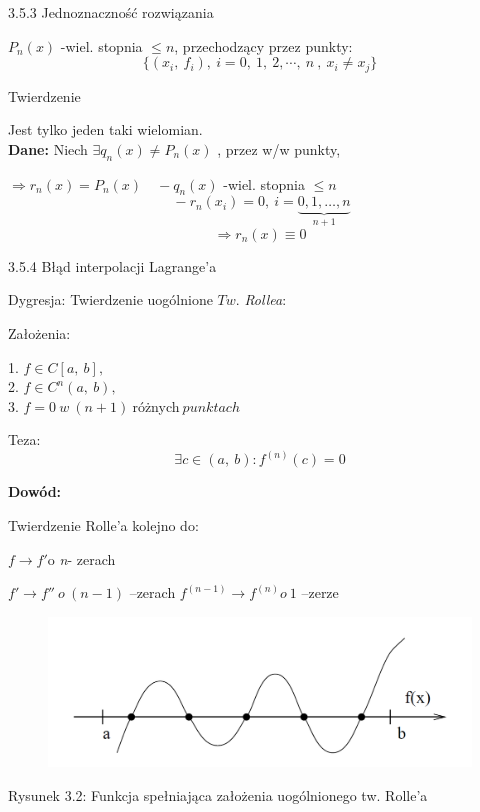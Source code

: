 \begin{frame}{3.5.3 Jednoznaczność rozwiązania}

$P_{n}(x)$ -wiel. stopnia $\leq n$, przechodzący przez punkty:
$$
\{(x_{i},\ f_{i}),\ i=0,\ 1,\ 2,\cdots ,\ n\ ,\ x_{i}\neq x_{j}\}
$$

\begin{block}{Twierdzenie}

Jest tylko jeden taki wielomian.\\
\vspace{2mm}
\textbf{Dane:} Niech $\exists q_{n}(x)\neq P_{n}(x)$ , przez w/w punkty,

$\Rightarrow r_{n}(x)=P_{n}(x) \quad -q_{n}(x)$ -wiel. stopnia $\leq n$
$$
 \: -r_{n}(x_{i})=0,\ i=\underbrace{0,1, \dots, n}_{n+1}
$$
$$
\Rightarrow r_{n}(x)\equiv 0
$$
\end{block}
\end{frame}

\begin{frame}{3.5.4 Błąd interpolacji Lagrange'a}

\begin{block}
{Dygresja: Twierdzenie uogólnione $Tw$. {\it Rollea}:}

Założenia:
\begin{center}
1. $f\in C[a,\ b],$ \\
2. $f\in C^{n}(a,\ b),$  \\
3. $f=0\: w\: (n+1)\: $różnych$ \:punktach$
\end{center}


Teza:
$$
\exists c\in(a,\ b):f^{(n)}(c)=0
$$
\end{block}
\textbf{Dowód:}

Twierdzenie Rolle'a kolejno do:

$f \rightarrow f'\mathrm{o}$ {\it n}- zerach

$f' \rightarrow f'' \:o\:(n-1)$ --zerach \newline
$f^{(n-1)} \rightarrow f^{(n)} o\: 1$ \: --zerze
 \end{frame}
 
 \begin{frame}
 \begin{figure}[h]
			\includegraphics[width=1 \linewidth]{img/3/interpol_3_5}
	\end{figure}
Rysunek 3.2: Funkcja spełniająca założenia uogólnionego tw. Rolle'a 
 \end{frame}
 
